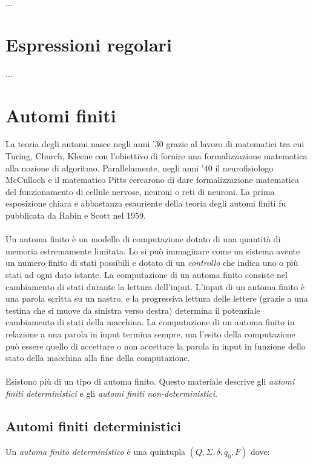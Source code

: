 \documentclass[]{article}
\begin{document}
...



\newpage



\section{Espressioni regolari}

...



\newpage



\section{Automi finiti}

La teoria degli automi nasce negli anni '30 grazie al lavoro di matematici tra cui Turing, Church, Kleene
con l'obiettivo di fornire una formalizzazione matematica alla nozione di algoritmo. Parallelamente, negli
anni '40 il neurofisiologo McCulloch e il matematico Pitts cercarono di dare formalizzazione matematica del
funzionamento di cellule nervose, neuroni o reti di neuroni. La prima esposizione chiara e abbastanza
esauriente della teoria degli automi finiti fu pubblicata da Rabin e Scott nel 1959.
\\
\\
Un automa finito è un modello di computazione dotato di una quantità di memoria estremamente limitata. Lo
si può immaginare come un sistema avente un numero finito di stati possibili e dotato di un \textit{controllo}
che indica uno o più stati ad ogni dato istante. La computazione di un automa finito consiste nel cambiamento
di stati durante la lettura dell'input. L'input di un automa finito è una parola scritta su un nastro, e la
progressiva lettura delle lettere (grazie a una testina che si muove da sinistra verso destra) determina il
potenziale cambiamento di stati della macchina. La computazione di un automa finito in relazione a una
parola in input termina sempre, ma l'esito della computazione può essere quello di accettare o non accettare
la parola in input in funzione dello stato della macchina alla fine della computazione.
\\
\\
Esistono più di un tipo di automa finito. Questo materiale descrive gli \textit{automi finiti deterministici}
e gli \textit{automi finiti non-deterministici}.


\subsection{Automi finiti deterministici}
Un \textit{automa finito deterministico} è una quintupla \mbox{$(Q, \Sigma, \delta, q_0, F)$} dove:
\end{document}
